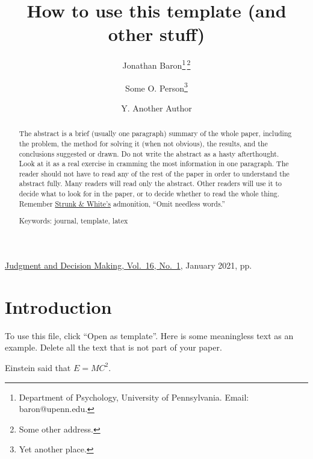 \documentclass[12pt]{article}
\title{How to use this template (and other stuff)}
\author{
Jonathan Baron\thanks{Department of Psychology, University of
  Pennsylvania. Email: baron@upenn.edu.}\;\,\thanks{Some other address.}
\and 
  Some O. Person\thanks{Yet another place.} 
\and
  Y. Another Author\footnotemark[2] %
}
\date{} %
\newcommand{\jref}{http://journal.sjdm.org/vol16.1.html}
\newcommand{\jhead}{Judgment and Decision Making, Vol.~16, No.~1}
\newcommand{\jdate}{January 2021}
\begin{document}

\begin{htmlonly}
\href{\jref}{\jhead}, \jdate, pp.\
\end{htmlonly}

\maketitle
\thispagestyle{firstpage}

\begin{abstract}

The abstract is a brief (usually one paragraph) summary
of the whole paper, including the problem, the method for solving
it (when not obvious), the results, and the conclusions suggested
or drawn.  Do not write the abstract as a hasty
afterthought. Look at it as a real exercise in cramming the most
information in one paragraph.  The reader should not have to read
any of the rest of the paper in order to understand the abstract
fully.  Many readers will read only the abstract.  Other readers
will use it to decide what to look for in the paper, or to decide
whether to read the whole thing.  Remember 
\href{http://en.wikipedia.org/wiki/The_Elements_of_Style}{Strunk \&
  White's} admonition, ``Omit needless words.''

\smallskip
\noindent
Keywords: journal, template, latex
\end{abstract}

{\renewcommand{\thefootnote}{}
}

\saythanks

\setlength{\baselineskip}{16pt plus.2pt}

\section{Introduction}

To use this file, click ``Open as template''. Here is some meaningless
text as an example. Delete all the text that is not part of your paper.

Einstein said that $E = MC^2$.
\end{document}
